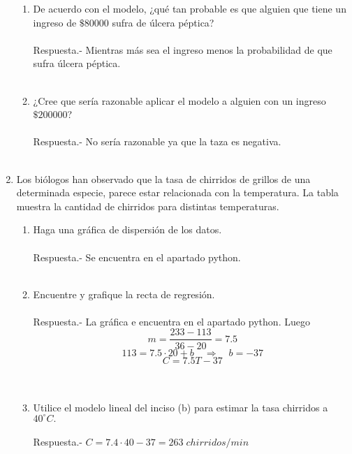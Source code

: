\begin{enumerate}
\begin{enumerate}[\bfseries (a)]
	\item De acuerdo con el modelo, ¿qué tan probable es que alguien que tiene un ingreso de $ \$ 80000$ sufra de úlcera péptica?\\\\
	    Respuesta.-\; Mientras más sea el ingreso menos la probabilidad de que sufra úlcera péptica.\\\\

	\item ¿Cree que sería razonable aplicar el modelo a alguien con un ingreso $\$ 200000$?\\\\
	    Respuesta.-\; No sería razonable ya que la taza es negativa.\\\\

    \end{enumerate}

    \item Los biólogos han observado que la tasa de chirridos de grillos de una determinada especie, parece estar relacionada con la temperatura. La tabla muestra la cantidad de chirridos para distintas temperaturas. \\
    \begin{enumerate}[\bfseries (a)]
	
	\item Haga una gráfica de dispersión de los datos.\\\\
	    Respuesta.- Se encuentra en el apartado python.\\\\
	
	\item Encuentre y grafique la recta de regresión.\\\\
	    Respuesta.- La gráfica e encuentra en el apartado python. Luego $$m=\dfrac{233-113}{36-20} = 7.5$$ $$113 = 7.5\cdot 20 + b \quad \Rightarrow \quad b = - 37$$ $$C = 7.5 T - 37$$\\\\
	
	\item Utilice el modelo lineal del inciso (b) para estimar la tasa chirridos a $40 ^\circ C.$\\\\
	    Respuesta.-\; $C = 7.4\cdot 40 - 37 = 263 \; chirridos/min$\\\\


\end{enumerate}
\end{enumerate}
